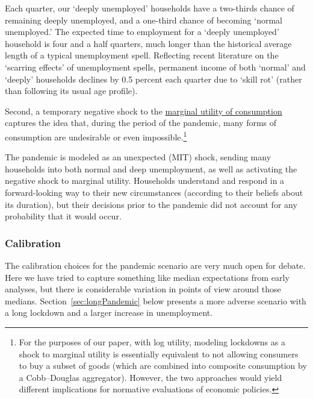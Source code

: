 \documentclass[titlepage,a4paper]{\econtex}
\begin{document}
Each quarter, our `deeply unemployed' households have a two-thirds chance of remaining deeply unemployed, and a one-third chance of becoming `normal unemployed.'
The expected time to employment for a `deeply unemployed' household is four and a half quarters, much longer than the historical average length of a typical unemployment spell.  Reflecting recent literature on the `scarring effects' of unemployment spells, permanent income of both `normal' and `deeply' households declines by 0.5 percent each quarter due to `skill rot' (rather than following its usual age profile).

Second, a temporary negative shock to the \href{https://www.investopedia.com/terms/m/marginalutility.asp}{marginal utility of consumption} captures the idea that, during the period of the pandemic, many forms of consumption are undesirable or even impossible.\footnote{For the purposes of our paper, with log utility, modeling lockdowns as a shock to marginal utility is essentially equivalent to not allowing consumers to buy a subset of goods (which are combined into composite consumption by a Cobb--Douglas aggregator). However, the two approaches would yield different implications for normative evaluations of economic policies.}

The pandemic is modeled as an unexpected (MIT) shock, sending many households into both normal and deep unemployment, as well as activating the negative shock to marginal utility. Households understand and respond in a forward-looking way to their new circumstances (according to their beliefs about its duration), but their decisions prior to the pandemic did not account for any probability that it would occur.

\subsubsection{Calibration}
The calibration choices for the pandemic scenario are very much open for debate. Here we have tried to capture something like median expectations from early analyses, but there is considerable variation in points of view around those medians.
Section~\ref{sec:longPandemic} below presents a more adverse scenario with a long lockdown and a larger increase in unemployment.
\end{document}
